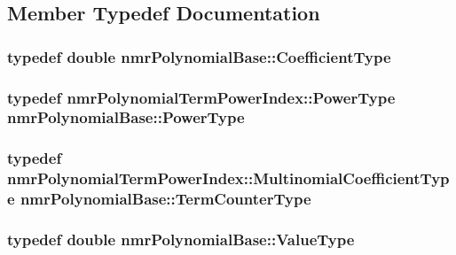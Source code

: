 \subsection{Member Typedef Documentation}
\hypertarget{classnmr_polynomial_base_a8693efdfc8585ccb49abea69f74f3eef}{
\subsubsection[{Coefficient\-Type}]{\setlength{\rightskip}{0pt plus 5cm}typedef double {\bf nmr\-Polynomial\-Base\-::\-Coefficient\-Type}}}\label{classnmr_polynomial_base_a8693efdfc8585ccb49abea69f74f3eef}
\hypertarget{classnmr_polynomial_base_a58607c884bf2e6725a77ed4d9e14ba26}{
\subsubsection[{Power\-Type}]{\setlength{\rightskip}{0pt plus 5cm}typedef {\bf nmr\-Polynomial\-Term\-Power\-Index\-::\-Power\-Type} {\bf nmr\-Polynomial\-Base\-::\-Power\-Type}}}\label{classnmr_polynomial_base_a58607c884bf2e6725a77ed4d9e14ba26}
\hypertarget{classnmr_polynomial_base_a4b0abd66b12b6f5bfb30d0eb1607e661}{
\subsubsection[{Term\-Counter\-Type}]{\setlength{\rightskip}{0pt plus 5cm}typedef {\bf nmr\-Polynomial\-Term\-Power\-Index\-::\-Multinomial\-Coefficient\-Type} {\bf nmr\-Polynomial\-Base\-::\-Term\-Counter\-Type}}}\label{classnmr_polynomial_base_a4b0abd66b12b6f5bfb30d0eb1607e661}
\hypertarget{classnmr_polynomial_base_a72f0bc16b225e4708bcf15a77ba206e3}{
\subsubsection[{Value\-Type}]{\setlength{\rightskip}{0pt plus 5cm}typedef double {\bf nmr\-Polynomial\-Base\-::\-Value\-Type}}}\label{classnmr_polynomial_base_a72f0bc16b225e4708bcf15a77ba206e3}
